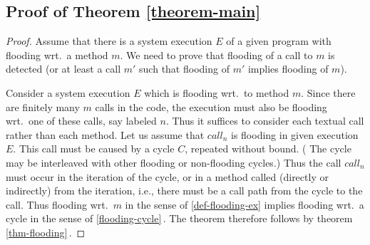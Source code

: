 
\subsection{Proof of Theorem \ref{theorem-main}}
\begin{proof}
Assume that there is a system execution $E$ of a given program with
flooding wrt.\ a method $m$.  We need to prove that flooding of a call
to $m$ is detected (or at least a call $m'$ such that flooding of $m'$
implies flooding of $m$).

Consider a system execution $E$ which is flooding  wrt.\ to method $m$.  Since
there are finitely many $m$ calls in the code, the execution must also
be flooding  wrt.\ one of these calls, say labeled $n$.  Thus it suffices
to consider each textual call rather than each method.  Let us assume
that $call_n$ is flooding in given execution $E$.
This call must be caused by a cycle $C$, repeated without bound.  (%
The cycle may be interleaved with other flooding or non-flooding
cycles.)  Thus the call $call_n$ must occur 
in the iteration of the cycle, or in 
a method called (directly or indirectly) from the iteration,
i.e., there must be a call path from the cycle to the call.
Thus flooding wrt.\ $m$ in the sense of \ref{def-flooding-ex}  
implies flooding wrt.\ a cycle in the sense of \ref{flooding-cycle}\,.
The theorem therefore follows by theorem \ref{thm-flooding}\,.
\end{proof}



